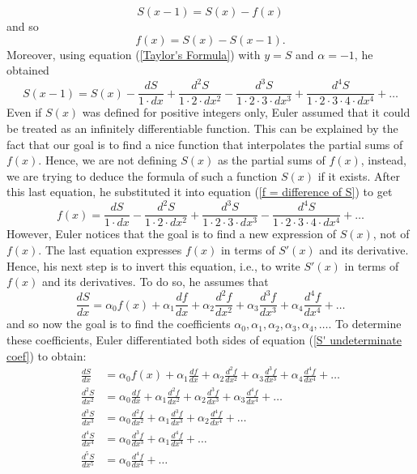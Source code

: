 $$S(x - 1) = S(x) - f(x)$$
and so
\begin{equation} \label{f = difference of S}
    f(x) = S(x) - S(x-1).
\end{equation}
Moreover, using equation (\ref{Taylor's Formula}) with $y = S$ and $\alpha = -1$, he obtained
$$S(x-1) = S(x) - \frac{dS}{1\cdot dx} + \frac{d^2S}{1\cdot 2\cdot dx^2} - \frac{d^3S}{1\cdot 2\cdot 3 \cdot  dx^3} + \frac{d^4S}{1\cdot 2\cdot 3 \cdot 4\cdot dx^4} + \dots$$
Even if $S(x)$ was defined for positive integers only, Euler assumed that it could be treated as an infinitely differentiable function. This can be explained by the fact that our goal is to find a nice function that interpolates the partial sums of $f(x)$. Hence, we are not defining $S(x)$ as the partial sums of $f(x)$, instead, we are trying to deduce the formula of such a function $S(x)$ if it exists. After this last equation, he substituted it into equation (\ref{f = difference of S}) to get
\begin{equation} \label{f in terms of S}
    f(x) = \frac{dS}{1\cdot dx} - \frac{d^2S}{1\cdot 2\cdot dx^2} + \frac{d^3S}{1\cdot 2\cdot 3 \cdot  dx^3} - \frac{d^4S}{1\cdot 2\cdot 3 \cdot 4\cdot dx^4} + \dots
\end{equation}
However, Euler notices that the goal is to find a new expression of $S(x)$, not of $f(x)$. The last equation expresses $f(x)$ in terms of $S'(x)$ and its derivative. Hence, his next step is to invert this equation, i.e., to write $S'(x)$ in terms of $f(x)$ and its derivatives. To do so, he assumes that
\begin{equation} \label{S' undeterminate coef}
\frac{dS}{dx} = \alpha_0 f(x) + \alpha_1 \frac{df}{dx} + \alpha_2 \frac{d^2f}{dx^2} + \alpha_3 \frac{d^3f}{dx^3} + \alpha_4 \frac{d^4f}{dx^4} + \dots
\end{equation}
and so now the goal is to find the coefficients $\alpha_0, \alpha_1, \alpha_2, \alpha_3, \alpha_4, \dots$. To determine these coefficients, Euler differentiated both sides of equation (\ref{S' undeterminate coef}) to obtain:
\begin{align*}
    \frac{dS}{dx} &= \alpha_0 f(x) + \alpha_1 \frac{df}{dx} + \alpha_2 \frac{d^2f}{dx^2} + \alpha_3 \frac{d^3f}{dx^3} + \alpha_4 \frac{d^4f}{dx^4} + \dots\\
    \frac{d^2S}{dx^2} &= \alpha_0 \frac{df}{dx} + \alpha_1 \frac{d^2f}{dx^2} + \alpha_2 \frac{d^3f}{dx^3} + \alpha_3 \frac{d^4f}{dx^4} + \dots\\
    \frac{d^3S}{dx^3} &= \alpha_0 \frac{d^2f}{dx^2} + \alpha_1 \frac{d^3f}{dx^3} + \alpha_2 \frac{d^4f}{dx^4} + \dots\\
    \frac{d^4S}{dx^4} &= \alpha_0 \frac{d^3f}{dx^3} + \alpha_1 \frac{d^4f}{dx^4} + \dots\\
    \frac{d^5S}{dx^5} &= \alpha_0 \frac{d^4f}{dx^4} + \dots\\
\end{align*}
